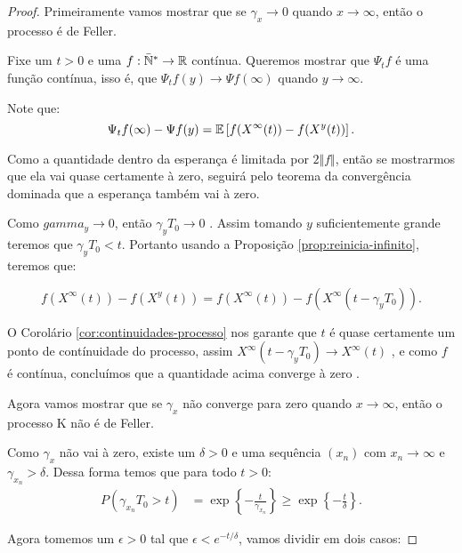 \begin{proof}

  Primeiramente vamos mostrar que se $\gamma_x \to 0$ quando $x \to
  \infty$, então o processo é de Feller.

  Fixe um $t > 0$ e uma $f: {\mathbb{\bar{N}^*}} \to {\mathbb{R}}$ contínua. Queremos mostrar
  que $\Psi_t f$ é uma função contínua, isso é, que $\Psi_t f(y) \to
  \Psi f (\infty)$ quando $y \to \infty$.

  Note que:
  \begin{displaymath}
    \Psi_t f(\infty) - \Psi f (y) =
    {\mathbb{E}} \left[
      f(X^\infty(t)) - f(X^y(t))
    \right].
  \end{displaymath}

  Como a quantidade dentro da esperança é limitada por $2 \Vert f
  \Vert$, então se mostrarmos que ela vai quase certamente à zero,
  seguirá pelo teorema da convergência dominada que a esperança também
  vai à zero.

  Como $gamma_y \to 0$, então $\gamma_y T_0 \to 0$ \qc. Assim tomando
  $y$ suficientemente grande teremos que $\gamma_y T_0 < t$. Portanto
  usando a Proposição \ref{prop:reinicia-infinito}, teremos que:

  \begin{displaymath}
    f(X^\infty(t)) - f(X^y(t)) = 
    f(X^\infty(t)) - f(X^\infty(t-\gamma_y T_0)).
  \end{displaymath}

  O Corolário \ref{cor:continuidades-processo} nos garante que $t$ é
  quase certamente um ponto de contínuidade do processo, assim
  $X^\infty(t-\gamma_y T_0) \to X^\infty(t)$ \qc, e como $f$ é
  contínua, concluímos que a quantidade acima converge à zero \qc.

  Agora vamos mostrar que se $\gamma_x$ não converge para zero quando
  $x \to \infty$, então o processo K não é de Feller.

  Como $\gamma_x$ não vai à zero, existe um $\delta > 0$ e uma
  sequência $(x_n)$ com $x_n \to \infty$ e $\gamma_{x_n} >
  \delta$. Dessa forma temos que para todo $t > 0$:
  \begin{align*}
    P(\gamma_{x_n} T_0 > t) &=
    \exp\left\{ -\frac{t}{\gamma_{x_n}}\right\}
    \geq  \exp\left\{ -\frac{t}{\delta}\right\}.
  \end{align*}

  Agora tomemos um $\epsilon > 0 $ tal que $\epsilon < e^{-t/\delta}$,
  vamos dividir em dois casos:

\end{proof}

